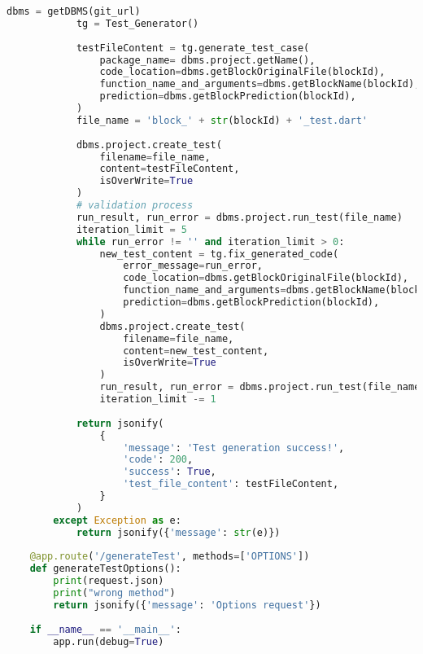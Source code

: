 \begin{lstlisting}[language=Python, caption={$\texttt{main.py}$ file.}, label={lst:15}]
            dbms = getDBMS(git_url)
            tg = Test_Generator()
            
            testFileContent = tg.generate_test_case(
                package_name= dbms.project.getName(),
                code_location=dbms.getBlockOriginalFile(blockId),
                function_name_and_arguments=dbms.getBlockName(blockId),
                prediction=dbms.getBlockPrediction(blockId),
            )
            file_name = 'block_' + str(blockId) + '_test.dart'
            
            dbms.project.create_test(
                filename=file_name,
                content=testFileContent,
                isOverWrite=True
            )
            # validation process
            run_result, run_error = dbms.project.run_test(file_name)
            iteration_limit = 5
            while run_error != '' and iteration_limit > 0:
                new_test_content = tg.fix_generated_code(
                    error_message=run_error,
                    code_location=dbms.getBlockOriginalFile(blockId),
                    function_name_and_arguments=dbms.getBlockName(blockId),
                    prediction=dbms.getBlockPrediction(blockId),
                )
                dbms.project.create_test(
                    filename=file_name,
                    content=new_test_content,
                    isOverWrite=True
                )
                run_result, run_error = dbms.project.run_test(file_name)
                iteration_limit -= 1
            
            return jsonify(
                {
                    'message': 'Test generation success!',
                    'code': 200,
                    'success': True,
                    'test_file_content': testFileContent,
                }
            )
        except Exception as e:
            return jsonify({'message': str(e)})
    
    @app.route('/generateTest', methods=['OPTIONS'])
    def generateTestOptions():
        print(request.json)
        print("wrong method")
        return jsonify({'message': 'Options request'})
        
    if __name__ == '__main__':
        app.run(debug=True)
\end{lstlisting}